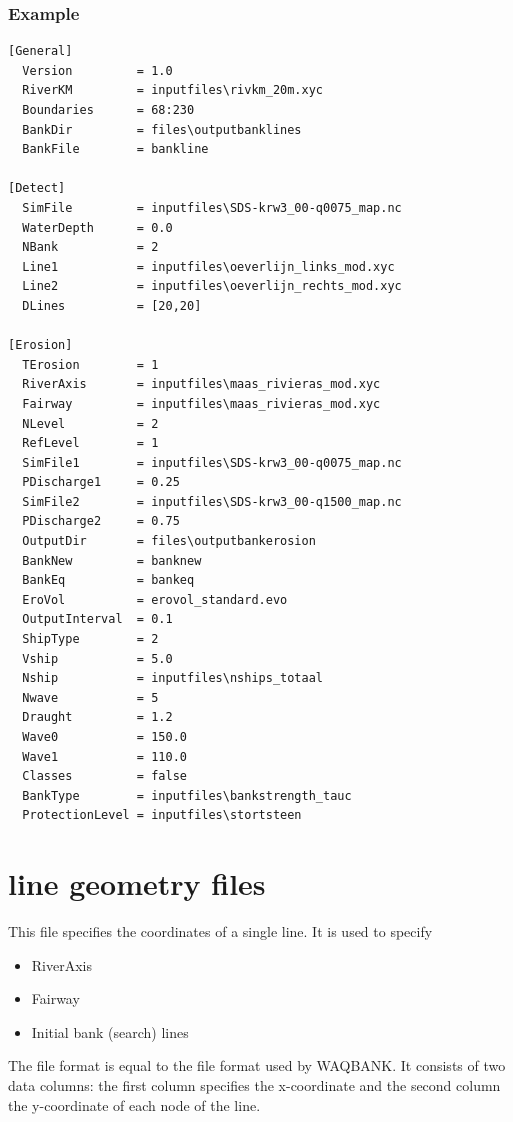 \subsubsection*{Example}

\begin{Verbatim}
[General]
  Version         = 1.0
  RiverKM         = inputfiles\rivkm_20m.xyc
  Boundaries      = 68:230
  BankDir         = files\outputbanklines
  BankFile        = bankline

[Detect]
  SimFile         = inputfiles\SDS-krw3_00-q0075_map.nc
  WaterDepth      = 0.0
  NBank           = 2
  Line1           = inputfiles\oeverlijn_links_mod.xyc
  Line2           = inputfiles\oeverlijn_rechts_mod.xyc
  DLines          = [20,20]

[Erosion]
  TErosion        = 1
  RiverAxis       = inputfiles\maas_rivieras_mod.xyc
  Fairway         = inputfiles\maas_rivieras_mod.xyc
  NLevel          = 2
  RefLevel        = 1
  SimFile1        = inputfiles\SDS-krw3_00-q0075_map.nc
  PDischarge1     = 0.25
  SimFile2        = inputfiles\SDS-krw3_00-q1500_map.nc
  PDischarge2     = 0.75
  OutputDir       = files\outputbankerosion
  BankNew         = banknew
  BankEq          = bankeq
  EroVol          = erovol_standard.evo
  OutputInterval  = 0.1
  ShipType        = 2
  Vship           = 5.0
  Nship           = inputfiles\nships_totaal
  Nwave           = 5
  Draught         = 1.2
  Wave0           = 150.0
  Wave1           = 110.0
  Classes         = false
  BankType        = inputfiles\bankstrength_tauc
  ProtectionLevel = inputfiles\stortsteen
\end{Verbatim}

\section{line geometry files}

This file specifies the coordinates of a single line.
It is used to specify

\begin{itemize}
\item RiverAxis
\item Fairway
\item Initial bank (search) lines
\end{itemize}

The file format is equal to the file format used by WAQBANK.
It consists of two data columns: the first column specifies the x-coordinate and the second column the y-coordinate of each node of the line.

